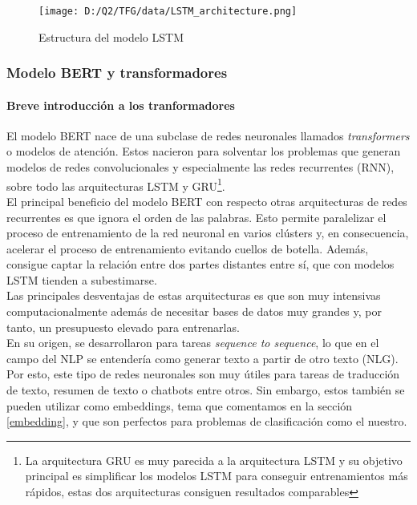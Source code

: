\documentclass[10pt,riqno,a4paper,twoside]{article}\usepackage[]{graphicx}\usepackage[]{color}
\begin{document}
\label{LSTM_model}
\begin{figure}[h]
  \caption{Estructura del modelo LSTM}
  \begin{center}
\texttt{[image: D:/Q2/TFG/data/LSTM\_architecture.png]}
\end{center}
\end{figure}


\subsubsection{Modelo BERT y transformadores}

\paragraph{Breve introducción a los tranformadores}

El modelo BERT nace de una subclase de redes neuronales llamados \textit{transformers} o modelos de atención. Estos nacieron para solventar los problemas que generan modelos de redes convolucionales y especialmente las redes recurrentes (RNN), sobre todo las arquitecturas LSTM y GRU\footnote{La arquitectura GRU es muy parecida a la arquitectura LSTM y su objetivo principal es simplificar los modelos LSTM para conseguir entrenamientos más rápidos, estas dos arquitecturas consiguen resultados comparables}.\\

 El principal beneficio del modelo BERT con respecto otras arquitecturas de redes recurrentes es que ignora el orden de las palabras. Esto permite paralelizar el proceso de entrenamiento de la red neuronal en varios clústers y, en consecuencia, acelerar el proceso de entrenamiento evitando cuellos de botella. Además, consigue captar la relación entre dos partes distantes entre sí, que con modelos LSTM tienden a subestimarse.\\
 
Las principales desventajas de estas arquitecturas es que son muy intensivas computacionalmente además de necesitar bases de datos muy grandes y, por tanto, un presupuesto elevado para entrenarlas. \\

En su origen, se desarrollaron para tareas \textit{sequence to sequence}, lo que en el campo del NLP se entendería como generar texto a partir de otro texto (NLG). Por esto, este tipo de redes neuronales son muy útiles para tareas de traducción de texto, resumen de texto o chatbots entre otros. Sin embargo, estos también se pueden utilizar como embeddings, tema que comentamos en la sección \ref{embedding}, y que son perfectos para problemas de clasificación como el nuestro. \\
\end{document}
